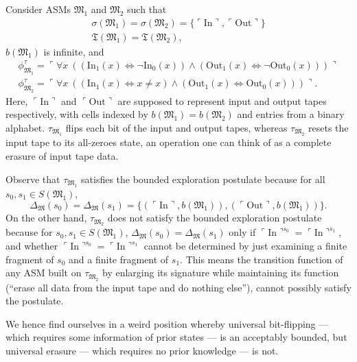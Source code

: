 \documentclass[12pt]{article}
\numberwithin{equation}{section}
\begin{document}
\begin{ex}\label{ex218}
Consider ASMs $\mathfrak{M}_1$ and $\mathfrak{M}_2$ such that 
\begin{gather*}
    \sigma(\mathfrak{M}_1) = \sigma(\mathfrak{M}_2) = \{\ulcorner \mathrm{In} \urcorner, \ulcorner \mathrm{Out} \urcorner\} \\
    \mathfrak{T}(\mathfrak{M}_1) = \mathfrak{T}(\mathfrak{M}_2) \text{,}
\end{gather*}
$b(\mathfrak{M}_1)$ is infinite, and
\begin{gather*}
    \phi^{\tau}_{\mathfrak{M}_1} = \ulcorner \forall x \ ((\mathrm{In}_1(x) \iff \neg \mathrm{In}_0(x)) \wedge (\mathrm{Out}_1(x) \iff \neg \mathrm{Out}_0(x))) \urcorner \\
    \phi^{\tau}_{\mathfrak{M}_2} = \ulcorner \forall x \ ((\mathrm{In}_1(x) \iff x \neq x) \wedge (\mathrm{Out}_1(x) \iff \mathrm{Out}_0(x))) \urcorner \text{.}
\end{gather*}
Here, $\ulcorner \mathrm{In} \urcorner$ and $\ulcorner \mathrm{Out} \urcorner$ are supposed to represent input and output tapes respectively, with cells indexed by $b(\mathfrak{M}_1) = b(\mathfrak{M}_2)$ and entries from a binary alphabet. $\tau_{\mathfrak{M}_1}$ flips each bit of the input and output tapes, whereas $\tau_{\mathfrak{M}_2}$ resets the input tape to its all-zeroes state, an operation one can think of as a complete erasure of input tape data.

Observe that $\tau_{\mathfrak{M}_1}$ satisfies the bounded exploration postulate because for all $s_0, s_1 \in S(\mathfrak{M}_1)$, 
\begin{equation*}
    \Delta_{\mathfrak{M}}(s_0) = \Delta_{\mathfrak{M}}(s_1) = \{(\ulcorner \mathrm{In} \urcorner, b(\mathfrak{M}_1)), (\ulcorner \mathrm{Out} \urcorner, b(\mathfrak{M}_1))\} \text{.}
\end{equation*}
On the other hand, $\tau_{\mathfrak{M}_2}$ does not satisfy the bounded exploration postulate because for $s_0, s_1 \in S(\mathfrak{M}_1)$, $\Delta_{\mathfrak{M}}(s_0) = \Delta_{\mathfrak{M}}(s_1)$ only if $\ulcorner \mathrm{In} \urcorner^{s_0} = \ulcorner \mathrm{In} \urcorner^{s_1}$, and whether $\ulcorner \mathrm{In} \urcorner^{s_0} = \ulcorner \mathrm{In} \urcorner^{s_1}$ cannot be determined by just examining a finite fragment of $s_0$ and a finite fragment of $s_1$. This means the transition function of any ASM built on $\tau_{\mathfrak{M}_2}$ by enlarging its signature while maintaining its function (``erase all data from the input tape and do nothing else''), cannot possibly satisfy the postulate.

We hence find ourselves in a weird position whereby universal bit-flipping --- which requires some information of prior states --- is an acceptably bounded, but universal erasure --- which requires no prior knowledge --- is not.
\end{ex}
\end{document}
